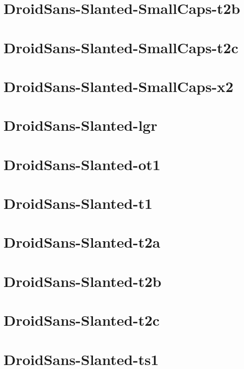 \documentclass{article}
\begin{document}
\section{DroidSans-Slanted-SmallCaps-t2b}

\section{DroidSans-Slanted-SmallCaps-t2c}

\section{DroidSans-Slanted-SmallCaps-x2}

\section{DroidSans-Slanted-lgr}

\section{DroidSans-Slanted-ot1}

\section{DroidSans-Slanted-t1}

\section{DroidSans-Slanted-t2a}

\section{DroidSans-Slanted-t2b}

\section{DroidSans-Slanted-t2c}

\section{DroidSans-Slanted-ts1}
\end{document}
